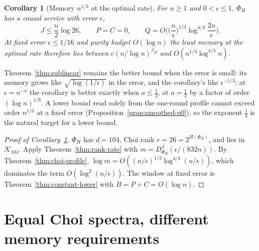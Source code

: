 \documentclass[11pt,a4paper]{article}
\theoremstyle{plain}
\newtheorem{corollary}[theorem]{Corollary}
\theoremstyle{definition}
\theoremstyle{remark}
\newcommand{\DChoi}{D^{J}}
\begin{document}
\begin{corollary}[Memory $n^{1/3}$ at the optimal rate]\label{cor:third}
For $n\ge1$ and $0<\epsilon\le1$, $\Phi_H$ has a causal service with error $\epsilon$,
\[
J\le\frac n2\log26,\qquad P=C=0,\qquad Q=O\Big(\Big(\frac n\epsilon\Big)^{1/3}\log^{4/3}\frac{2n}\epsilon\Big).
\]
At fixed error $\epsilon\le1/16$ and purity budget $O(\log n)$ the least memory at the optimal rate therefore lies between $c(n/\log n)^{\beta_H}$ and
$O(n^{1/3}\log^{4/3}n)$.
\end{corollary}

Theorem~\ref{thm:sublinear} remains the better bound when the error is small: its memory grows like $\sqrt{\log(1/\epsilon)}$ in the error, and the
corollary's like $\epsilon^{-1/3}$; at $\epsilon=n^{-a}$ the corollary is better exactly when $a\le\frac12$, at $a=\frac12$ by a factor of order $(\log n)^{1/6}$.
A lower bound read solely from the one-round profile cannot exceed order $n^{1/3}$ at a fixed error (Proposition~\ref{prop:smoothed-u0}), so the
exponent $\frac13$ is the natural target for a lower bound.


\begin{proof}[Proof of Corollary~\ref{cor:third}]
$\Phi_H$ has $d=104$, Choi rank $r=26=2^{H(\Phi_H)}$, and lies in $\mathcal K_{104}$. Apply Theorem~\ref{thm:rank-rate} with $m=\DChoi_{\Phi_H}(\epsilon/(832n))$. By
Theorem~\ref{thm:choi-profile}, $\log m=O((n/\epsilon)^{1/3}\log^{4/3}(n/\epsilon))$, which dominates the term $O(\log^2(n/\epsilon))$. The window at fixed error is
Theorem~\ref{thm:constant-lower} with $B=P+C=O(\log n)$.
\end{proof}


\section{Equal Choi spectra, different memory requirements}\label{sec:flat-choi-proof}
\end{document}

